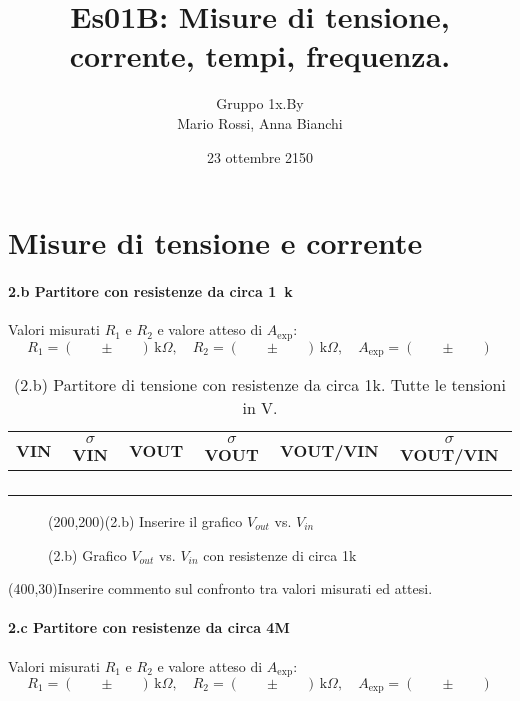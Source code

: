 \documentclass[10pt,a4paper]{article}
\author{Gruppo 1x.By \\ Mario Rossi, Anna Bianchi \rem{non dimenticate i nomi}}
\title{Es01B: Misure di tensione, corrente, tempi, frequenza.}
\newcommand{\exn}{\phantom{xxx}}
\begin{document}
\date{23 ottembre 2150}
\maketitle

\setcounter{section}{1}
\section{Misure di tensione e corrente}

\paragraph{2.b Partitore con resistenze da circa 1~k}
Valori misurati $R_1$ e $R_2$ e valore atteso di $A_\mathrm{exp}$:
\[
R_1 = ( \exn \pm \exn ) \,\mathrm{k}\Omega, \quad
R_2 = ( \exn \pm \exn ) \,\mathrm{k}\Omega, \quad
A_\mathrm{exp} = ( \exn \pm \exn ) 
\]


\begin{table}[h]
\centering
\begin{tabular}{|c|c|c|c|c|c|}
\hline 
VIN& $\sigma$ VIN  &VOUT	 & $\sigma$ VOUT& VOUT/VIN & $\sigma$ VOUT/VIN \\
\hline 
\exn & \exn & \exn & \exn & \exn &\exn \\
\exn & \exn & \exn & \exn & \exn &\exn \\
\exn & \exn & \exn & \exn & \exn &\exn \\
\exn & \exn & \exn & \exn & \exn &\exn \\
\hline 
\end{tabular} 
\caption{(2.b) Partitore di tensione con resistenze da circa 1k. Tutte le tensioni in V.\label{t:par1}}
\end{table}


\begin{figure}[h]
\centering
\framebox(200,200){(2.b) Inserire il grafico $V_{out}$ vs. $V_{in}$ }

\caption{(2.b) Grafico $V_{out}$ vs. $V_{in}$ con resistenze di circa 1k \label{f:par1}}
\end{figure}

\framebox(400,30){Inserire commento sul confronto tra valori misurati ed attesi.}


\paragraph{2.c Partitore con resistenze da circa 4M}
Valori misurati $R_1$ e $R_2$ e valore atteso di $A_\mathrm{exp}$:
\[
R_1 = ( \exn \pm \exn ) \,\mathrm{k}\Omega, \quad
R_2 = ( \exn \pm \exn ) \,\mathrm{k}\Omega, \quad
A_\mathrm{exp} = ( \exn \pm \exn ) 
\]
\end{document}

